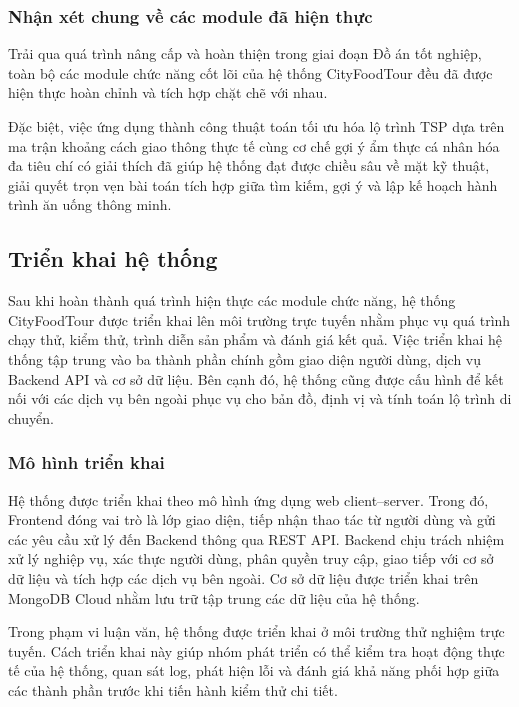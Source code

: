 \subsubsection{Nhận xét chung về các module đã hiện thực}
Trải qua quá trình nâng cấp và hoàn thiện trong giai đoạn Đồ án tốt nghiệp, toàn bộ các module chức năng cốt lõi của hệ thống CityFoodTour đều đã được hiện thực hoàn chỉnh và tích hợp chặt chẽ với nhau. 

Đặc biệt, việc ứng dụng thành công thuật toán tối ưu hóa lộ trình TSP dựa trên ma trận khoảng cách giao thông thực tế cùng cơ chế gợi ý ẩm thực cá nhân hóa đa tiêu chí có giải thích đã giúp hệ thống đạt được chiều sâu về mặt kỹ thuật, giải quyết trọn vẹn bài toán tích hợp giữa tìm kiếm, gợi ý và lập kế hoạch hành trình ăn uống thông minh.

\subsection{Triển khai hệ thống}

Sau khi hoàn thành quá trình hiện thực các module chức năng, hệ thống CityFoodTour
được triển khai lên môi trường trực tuyến nhằm phục vụ quá trình chạy thử, kiểm thử,
trình diễn sản phẩm và đánh giá kết quả. Việc triển khai hệ thống tập trung vào ba thành
phần chính gồm giao diện người dùng, dịch vụ Backend API và cơ sở dữ liệu. Bên cạnh đó,
hệ thống cũng được cấu hình để kết nối với các dịch vụ bên ngoài phục vụ cho bản đồ,
định vị và tính toán lộ trình di chuyển.

\subsubsection{Mô hình triển khai}

Hệ thống được triển khai theo mô hình ứng dụng web client--server. Trong đó, Frontend
đóng vai trò là lớp giao diện, tiếp nhận thao tác từ người dùng và gửi các yêu cầu xử lý
đến Backend thông qua REST API. Backend chịu trách nhiệm xử lý nghiệp vụ, xác thực
người dùng, phân quyền truy cập, giao tiếp với cơ sở dữ liệu và tích hợp các dịch vụ bên
ngoài. Cơ sở dữ liệu được triển khai trên MongoDB Cloud nhằm lưu trữ tập trung các dữ
liệu của hệ thống.

Trong phạm vi luận văn, hệ thống được triển khai ở môi trường thử nghiệm trực tuyến.
Cách triển khai này giúp nhóm phát triển có thể kiểm tra hoạt động thực tế của hệ thống,
quan sát log, phát hiện lỗi và đánh giá khả năng phối hợp giữa các thành phần trước khi
tiến hành kiểm thử chi tiết.

